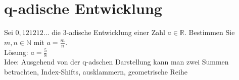 \section{q-adische Entwicklung}
Sei $0,121212\dots$ die $3$-adische Entwicklung einer Zahl $a \in \mathbb{R}$. Bestimmen Sie $m, n \in \mathbb{N}$ mit $a = \frac{m}{n}$.\\
Lösung: $a = \frac{5}{8}$\\
Idee: Ausgehend von der q-adschen Darstellung kann man zwei Summen betrachten, Index-Shifts, ausklammern, geometrische Reihe 